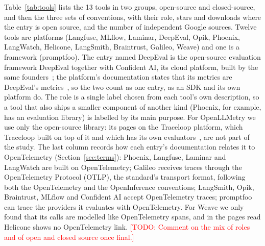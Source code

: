 \documentclass[conference]{IEEEtran}
\newcommand{\todo}[1]{\textcolor{red}{[TODO: #1]}}
\begin{document}
Table~\ref{tab:tools} lists the 13 tools in two groups, open-source and closed-source, and then the three sets of conventions, with their role, stars and downloads where the entry is open source, and the number of independent Google sources. Twelve tools are platforms (Langfuse, MLflow, Laminar, DeepEval, Opik, Phoenix, LangWatch, Helicone, LangSmith, Braintrust, Galileo, Weave) and one is a framework (promptfoo). The entry named DeepEval is the open-source evaluation framework DeepEval together with Confident AI, its cloud platform, built by the same founders~\cite{deepeval_readme}; the platform's documentation states that its metrics are DeepEval's metrics~\cite{confident_ai_docs}, so the two count as one entry, as an SDK and its own platform do. The role is a single label chosen from each tool's own description, so a tool that also ships a smaller component of another kind (Phoenix, for example, has an evaluation library) is labelled by its main purpose. For OpenLLMetry we use only the open-source library: its pages on the Traceloop platform, which Traceloop built on top of it and which has its own evaluators~\cite{traceloop_servicenow}, are not part of the study. The last column records how each entry's documentation relates it to OpenTelemetry (Section~\ref{sec:terms}): Phoenix, Langfuse, Laminar and LangWatch are built on OpenTelemetry; Galileo receives traces through the OpenTelemetry Protocol (OTLP), the standard's transport format, following both the OpenTelemetry and the OpenInference conventions; LangSmith, Opik, Braintrust, MLflow and Confident AI accept OpenTelemetry traces; promptfoo can trace the providers it evaluates with OpenTelemetry. For Weave we only found that its calls are modelled like OpenTelemetry spans, and in the pages read Helicone shows no OpenTelemetry link. \todo{Comment on the mix of roles and of open and closed source once final.}
\end{document}
